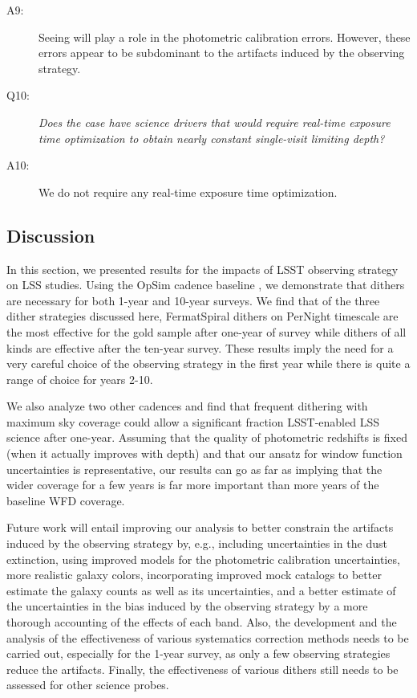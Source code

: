 \begin{description}
\item[A9:] Seeing will play a role in the photometric calibration
errors. However, these errors appear to be subdominant to the artifacts
induced by the observing strategy.

\item[Q10:] {\it Does the case have science drivers that would require
real-time exposure time optimization to obtain nearly constant
single-visit limiting depth?}

\item[A10:] We do not require any real-time exposure time optimization.

\end{description}

\subsection{Discussion}
\label{sec:\secname:discussion}

In this section, we presented results for the impacts of LSST observing
strategy on LSS studies. Using the OpSim cadence baseline
, we demonstrate that dithers are necessary
for both 1-year and 10-year surveys. We find that of the three dither strategies
discussed here, FermatSpiral dithers on PerNight  timescale are the most
effective for the gold sample after one-year of survey while  dithers of all kinds
are effective after the ten-year survey. These results imply the need for a very careful
choice of the observing strategy in the first year while there is quite a range of choice 
for years 2-10.

We also analyze two other cadences and find  that frequent dithering with
maximum  sky coverage could allow a significant  fraction LSST-enabled LSS
science after  one-year. Assuming that the quality of photometric redshifts is
fixed (when it actually improves with depth) and that our ansatz for window
function uncertainties is representative,  our results can go as far as implying
that the wider coverage for a few years is far more important than more years of the
baseline  WFD coverage.

Future work will entail improving our analysis to better constrain the
artifacts induced by the observing strategy by, e.g., including
uncertainties in the dust extinction, using improved models for the
photometric calibration uncertainties, more realistic galaxy colors,
incorporating improved mock catalogs to better estimate the galaxy
counts as well as its uncertainties, and a better estimate of the
uncertainties in the bias induced by the observing strategy by a more thorough accounting of the
effects of each band. Also, the development and the analysis of the
effectiveness of various systematics correction methods needs to be
carried out, especially for the 1-year survey, as only a few observing 
strategies reduce the artifacts. Finally, the effectiveness
of various dithers still needs to be assessed for other science probes.


\navigationbar

